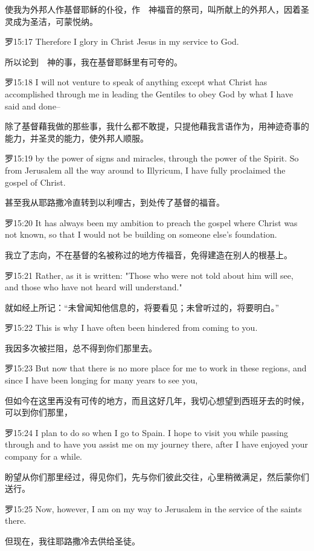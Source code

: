 \documentclass[a4paper,11pt,onecolumn,twoside]{ctexart}
\begin{document}
\begin{multicols}{2}
 使我为外邦人作基督耶稣的仆役，作　神福音的祭司，叫所献上的外邦人，因着圣灵成为圣洁，可蒙悦纳。


 罗15:17
 Therefore I glory in Christ Jesus in my service to God.

 所以论到　神的事，我在基督耶稣里有可夸的。


 罗15:18
 I will not venture to speak of anything except what Christ has accomplished through me in leading the Gentiles to obey God by what I have said and done--

 除了基督藉我做的那些事，我什么都不敢提，只提他藉我言语作为，用神迹奇事的能力，并圣灵的能力，使外邦人顺服。


 罗15:19
 by the power of signs and miracles, through the power of the Spirit. So from Jerusalem all the way around to Illyricum, I have fully proclaimed the gospel of Christ.

 甚至我从耶路撒冷直转到以利哩古，到处传了基督的福音。


 罗15:20
 It has always been my ambition to preach the gospel where Christ was not known, so that I would not be building on someone else's foundation.

 我立了志向，不在基督的名被称过的地方传福音，免得建造在别人的根基上。


 罗15:21
 Rather, as it is written: "Those who were not told about him will see, and those who have not heard will understand."

 就如经上所记：“未曾闻知他信息的，将要看见；未曾听过的，将要明白。”


 罗15:22
 This is why I have often been hindered from coming to you.

 我因多次被拦阻，总不得到你们那里去。


 罗15:23
 But now that there is no more place for me to work in these regions, and since I have been longing for many years to see you,

 但如今在这里再没有可传的地方，而且这好几年，我切心想望到西班牙去的时候，可以到你们那里，


 罗15:24
 I plan to do so when I go to Spain. I hope to visit you while passing through and to have you assist me on my journey there, after I have enjoyed your company for a while.

 盼望从你们那里经过，得见你们，先与你们彼此交往，心里稍微满足，然后蒙你们送行。


 罗15:25
 Now, however, I am on my way to Jerusalem in the service of the saints there.

 但现在，我往耶路撒冷去供给圣徒。



\end{multicols}
\end{document}
